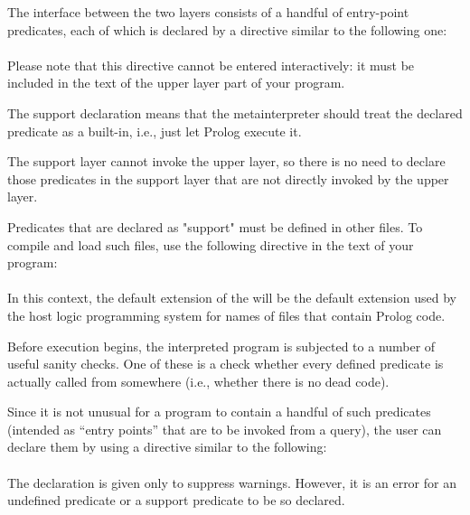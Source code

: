 The interface between the two layers consists of a handful of entry-point
predicates, each of which is  declared by a directive similar to the
following one:\\
\ind{}%
\label{dir:support}\\
Please note that this directive cannot be entered interactively: it must be
included in the text of the upper layer part of your program.

The support declaration means that the metainterpreter should treat the
declared predicate as a built-in, i.e., just let Prolog execute it.

The support layer cannot invoke the upper layer, so there is no need to
declare those predicates in the support layer that are not directly invoked
by the upper layer.

Predicates that are declared as "support" must be defined in other files.  To
compile and load such files, use the following directive in the text of your
program:\\
\ind{}%
\label{dir:load-support}\\
In this context, the default extension of the  will be the
default extension used by the host logic programming system for names
of files that contain Prolog code.%
%




Before execution begins, the interpreted program is subjected to a number of
useful sanity checks.  One of these is a check whether every defined
predicate is actually called from somewhere (i.e., whether there is no dead
code).

Since it is not unusual for a program to contain a handful of such predicates
(intended as ``entry points'' that are to be invoked from a query),
the user can declare them by using a directive similar to the following:\\
\ind{}\label{dir:top}\\
The declaration is given only to suppress warnings.  However, it is an error
for an undefined predicate or a support predicate to be so declared.



